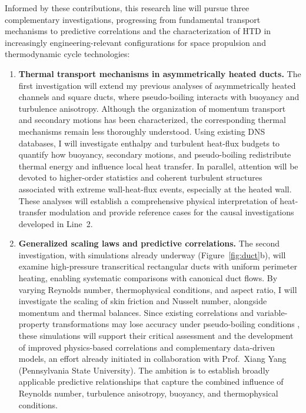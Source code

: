 \documentclass[11pt]{article}
\begin{document}
Informed by these contributions, this research line will pursue three complementary investigations, progressing from fundamental transport mechanisms to predictive correlations and the characterization of HTD in increasingly engineering-relevant configurations for space propulsion and thermodynamic cycle technologies:
\begin{enumerate}
	\item \textbf{Thermal transport mechanisms in asymmetrically heated ducts.}
	The first investigation will extend my previous analyses of asymmetrically heated channels and square ducts, where pseudo-boiling interacts with buoyancy and turbulence anisotropy.
	Although the organization of momentum transport and secondary motions has been characterized, the corresponding thermal mechanisms remain less thoroughly understood.
	Using existing DNS databases, I will investigate enthalpy and turbulent heat-flux budgets to quantify how buoyancy, secondary motions, and pseudo-boiling redistribute thermal energy and influence local heat transfer.
	In parallel, attention will be devoted to higher-order statistics and coherent turbulent structures associated with extreme wall-heat-flux events, especially at the heated wall.
	These analyses will establish a comprehensive physical interpretation of heat-transfer modulation and provide reference cases for the causal investigations developed in Line~2.
	
	\item \textbf{Generalized scaling laws and predictive correlations.}
	The second investigation, with simulations already underway (Figure~\ref{fig:duct}b), will examine high-pressure transcritical rectangular ducts with uniform perimeter heating, enabling systematic comparisons with canonical duct flows.
	By varying Reynolds number, thermophysical conditions, and aspect ratio, I will investigate the scaling of skin friction and Nusselt number, alongside momentum and thermal balances.
	Since existing correlations and variable-property transformations may lose accuracy under pseudo-boiling conditions \cite{Modesti2026,Li2025}, these simulations will support their critical assessment and the development of improved physics-based correlations and complementary data-driven models, an effort already initiated in collaboration with Prof.~Xiang Yang (Pennsylvania State University).
	The ambition is to establish broadly applicable predictive relationships that capture the combined influence of Reynolds number, turbulence anisotropy, buoyancy, and thermophysical conditions.
	

\end{enumerate}
\end{document}
